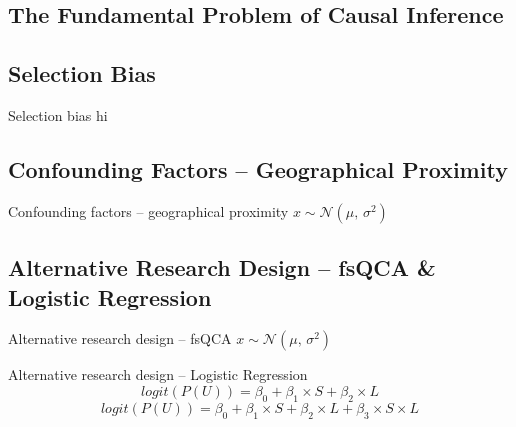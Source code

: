 \documentclass{beamer}
\begin{document}
	\subsection{The Fundamental Problem of Causal Inference}
	\subsection{Selection Bias}
	\begin{frame}{Selection bias}
		hi
	\end{frame}
	\subsection{Confounding Factors -- Geographical Proximity}
	\begin{frame}{Confounding factors -- geographical proximity}
		$x \sim \mathcal{N}(\mu,\,\sigma^{2})$
	\end{frame}
	\subsection{Alternative Research Design -- fsQCA \& Logistic Regression}
	\begin{frame}{Alternative research design -- fsQCA}
		$x \sim \mathcal{N}(\mu,\,\sigma^{2})$
	\end{frame}
	\begin{frame}{Alternative research design -- Logistic Regression}
		\begin{equation}
			logit(P(U))=\beta_0 + \beta_1 \times S + \beta_2 \times L
		\end{equation}
		\begin{equation}
			logit(P(U))=\beta_0 + \beta_1 \times S + \beta_2 \times L + \beta_3 \times S \times L
		\end{equation}
	\end{frame}
\end{document}
